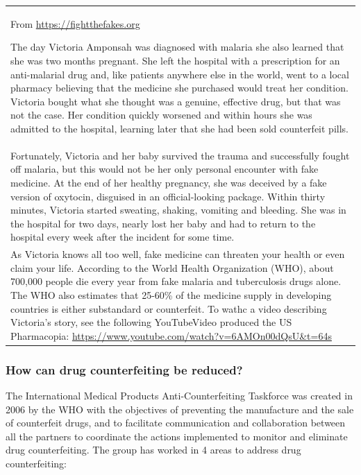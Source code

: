 \documentclass[
  11pt,
  paper=a4,
  ,captions=tableheading
]{scrartcl}
\begin{document}
\begin{longtable}[]{@{}
  >{\raggedright\arraybackslash}p{}@{}}
\toprule
\endhead
From \url{https://fightthefakes.org}

The day Victoria Amponsah was diagnosed with malaria she also learned
that she was two months pregnant. She left the hospital with a
prescription for an anti-malarial drug and, like patients anywhere else
in the world, went to a local pharmacy believing that the medicine she
purchased would treat her condition. Victoria bought what she thought
was a genuine, effective drug, but that was not the case. Her condition
quickly worsened and within hours she was admitted to the hospital,
learning later that she had been sold counterfeit pills. \\
Fortunately, Victoria and her baby survived the trauma and successfully
fought off malaria, but this would not be her only personal encounter
with fake medicine. At the end of her healthy pregnancy, she was
deceived by a fake version of oxytocin, disguised in an official-looking
package. Within thirty minutes, Victoria started sweating, shaking,
vomiting and bleeding. She was in the hospital for two days, nearly lost
her baby and had to return to the hospital every week after the incident
for some time. \\
As Victoria knows all too well, fake medicine can threaten your health
or even claim your life. According to the World Health Organization
(WHO), about 700,000 people die every year from fake malaria and
tuberculosis drugs alone. The WHO also estimates that 25-60\% of the
medicine supply in developing countries is either substandard or
counterfeit. To wathc a video describing Victoria's story, see the
following YouTubeVideo produced the US Pharmacopia:
\url{https://www.youtube.com/watch?v=6AMOn00dQsU\&t=64s} \\
\bottomrule
\end{longtable}

\hypertarget{how-can-drug-counterfeiting-be-reduced}{%
\subsubsection*{How can drug counterfeiting be
reduced?}\label{how-can-drug-counterfeiting-be-reduced}}

The International Medical Products Anti-Counterfeiting Taskforce was
created in 2006 by the WHO with the objectives of preventing the
manufacture and the sale of counterfeit drugs, and to facilitate
communication and collaboration between all the partners to coordinate
the actions implemented to monitor and eliminate drug counterfeiting.
The group has worked in 4 areas to address drug counterfeiting:
\end{document}
